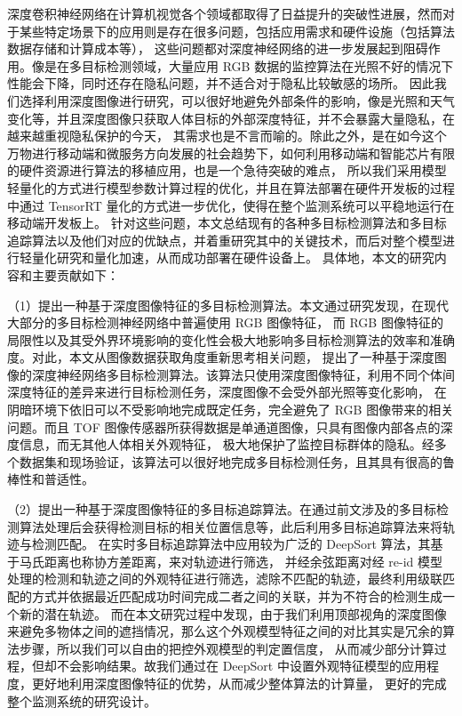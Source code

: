 \cleardoublepage

\vspace{-6mm}
\vspace{3mm}

深度卷积神经网络在计算机视觉各个领域都取得了日益提升的突破性进展，然而对于某些特定场景下的应用则是存在很多问题，包括应用需求和硬件设施（包括算法数据存储和计算成本等），
这些问题都对深度神经网络的进一步发展起到阻碍作用。像是在多目标检测领域，大量应用 RGB 数据的监控算法在光照不好的情况下性能会下降，同时还存在隐私问题，并不适合对于隐私比较敏感的场所。
因此我们选择利用深度图像进行研究，可以很好地避免外部条件的影响，像是光照和天气变化等，并且深度图像只获取人体目标的外部深度特征，并不会暴露大量隐私，在越来越重视隐私保护的今天，
其需求也是不言而喻的。除此之外，是在如今这个万物进行移动端和微服务方向发展的社会趋势下，如何利用移动端和智能芯片有限的硬件资源进行算法的移植应用，也是一个急待突破的难点，
所以我们采用模型轻量化的方式进行模型参数计算过程的优化，并且在算法部署在硬件开发板的过程中通过 TensorRT 量化的方式进一步优化，使得在整个监测系统可以平稳地运行在移动端开发板上。
针对这些问题，本文总结现有的各种多目标检测算法和多目标追踪算法以及他们对应的优缺点，并着重研究其中的关键技术，而后对整个模型进行轻量化研究和量化加速，从而成功部署在硬件设备上。
具体地，本文的研究内容和主要贡献如下：

（1）提出一种基于深度图像特征的多目标检测算法。本文通过研究发现，在现代大部分的多目标检测神经网络中普遍使用 RGB 图像特征，
而 RGB 图像特征的局限性以及其受外界环境影响的变化性会极大地影响多目标检测算法的效率和准确度。对此，本文从图像数据获取角度重新思考相关问题，
提出了一种基于深度图像的深度神经网络多目标检测算法。该算法只使用深度图像特征，利用不同个体间深度特征的差异来进行目标检测任务，深度图像不会受外部光照等变化影响，
在阴暗环境下依旧可以不受影响地完成既定任务，完全避免了 RGB 图像带来的相关问题。而且 TOF 图像传感器所获得数据是单通道图像，只具有图像内部各点的深度信息，而无其他人体相关外观特征，
极大地保护了监控目标群体的隐私。经多个数据集和现场验证，该算法可以很好地完成多目标检测任务，且其具有很高的鲁棒性和普适性。

（2）提出一种基于深度图像特征的多目标追踪算法。在通过前文涉及的多目标检测算法处理后会获得检测目标的相关位置信息等，此后利用多目标追踪算法来将轨迹与检测匹配。
在实时多目标追踪算法中应用较为广泛的 DeepSort 算法，其基于马氏距离也称协方差距离，来对轨迹进行筛选，
并经余弦距离对经 re-id 模型处理的检测和轨迹之间的外观特征进行筛选，滤除不匹配的轨迹，最终利用级联匹配的方式并依据最近匹配成功时间完成二者之间的关联，并为不符合的检测生成一个新的潜在轨迹。
而在本文研究过程中发现，由于我们利用顶部视角的深度图像来避免多物体之间的遮挡情况，那么这个外观模型特征之间的对比其实是冗余的算法步骤，所以我们可以自由的把控外观模型的判定置信度，
从而减少部分计算过程，但却不会影响结果。故我们通过在 DeepSort 中设置外观特征模型的应用程度，更好地利用深度图像特征的优势，从而减少整体算法的计算量，
更好的完成整个监测系统的研究设计。

